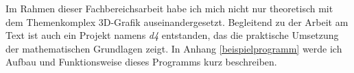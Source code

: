 Im Rahmen dieser Fachbereichsarbeit habe ich mich nicht nur theoretisch mit dem Themenkomplex 3D-Grafik auseinandergesetzt. Begleitend zu der Arbeit am Text ist auch ein Projekt namens \emph{d4} entstanden, das die praktische Umsetzung der mathematischen Grundlagen zeigt. In Anhang \ref{beispielprogramm} werde ich Aufbau und Funktionsweise dieses Programms kurz beschreiben.

